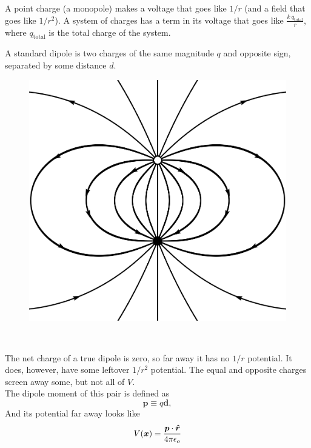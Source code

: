 \documentclass{article}
\begin{document}
\vspace{1em}

A point charge (a monopole) makes a voltage that goes like $1/r$ (and a field that goes like $1/r^2$). A system of charges has a term in its voltage that goes like $\displaystyle\frac{k\ q_{\text{total}}}{r}$, where $q_{\text{total}}$ is the total charge of the system.

\vspace{1em}

A standard dipole is two charges of the same magnitude $q$ and opposite sign, separated by some distance $d$.

\vspace{1em}

\begin{minipage}{0.5\textwidth}
\begin{figure}[H]
\centering
\includegraphics[width=\textwidth]{figures/4l1.png}
\end{figure}
\end{minipage}
~
\begin{minipage}{0.4\textwidth}
    The net charge of a true dipole is zero, so far away it has no $1/r$ potential. It does, however, have some leftover $1/r^2$ potential. The equal and opposite charges screen away some, but not all of $V$. \\[1.5em]
The dipole moment of this pair is defined as
\begin{equation*}
    \bm{p} \equiv q \bm{d},
\end{equation*}
And its potential far away looks like
\begin{equation*}
    V(\bm{x}) = \frac{\bm{p} \cdot \bm{\hat{r}}}{4\pi\epsilon_o}
\end{equation*}
\end{minipage}
\end{document}
